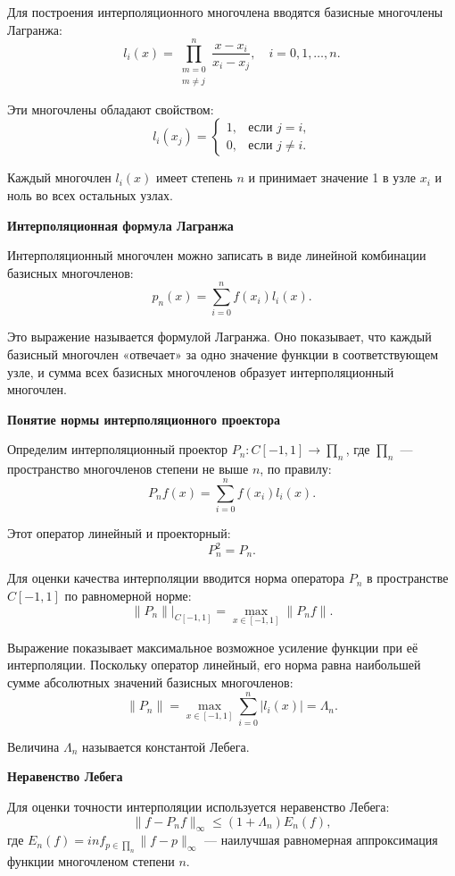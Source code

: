 \documentclass[14pt,openany,a4paper,oneside]{extarticle}
\begin{document}
	Для построения интерполяционного многочлена вводятся базисные многочлены Лагранжа: $$l_i(x)=\prod^n_{\substack{m=0 \\ m \ne j}}\frac{x-x_i}{x_i-x_j},  \quad i=0,1,\dots,n.$$
	
	Эти многочлены обладают свойством: $$l_i(x_j) = \begin{cases}
		1, & \text{если $j = i$,}\\
		0, & \text{если $j \ne i$.}
	\end{cases} 
	$$
	
	Каждый многочлен $l_i(x)$ имеет степень $n$ и принимает значение 1 в узле $x_i$ и ноль во всех остальных узлах.
	
	\textbf{Интерполяционная формула Лагранжа}
	
	Интерполяционный многочлен можно записать в виде линейной комбинации базисных многочленов: $$p_n(x)=\sum^n_{i=0}f(x_i)l_i(x).$$
	
	Это выражение называется формулой Лагранжа. Оно показывает, что каждый базисный многочлен «отвечает» за одно значение функции в соответствующем узле, и сумма всех базисных многочленов образует интерполяционный многочлен.
	
	\newpage 
	
	\textbf{Понятие нормы интерполяционного проектора}
	
	Определим интерполяционный проектор $P_n:C[-1,1]\rightarrow\prod_n$, где $\prod_n$ — пространство многочленов степени не выше $n$, по правилу: $$P_nf(x)=\sum^n_{i=0}f(x_i)l_i(x).$$
	
	Этот оператор линейный и проекторный: $$P_n^2=P_n.$$
	
	Для оценки качества интерполяции вводится норма оператора $P_n$ в пространстве $C[-1,1]$ по равномерной норме: $$\|P_n\||_{C[-1,1]}=\max_{x\in[-1,1]}\|P_nf\|.$$
	
	Выражение показывает максимальное возможное усиление функции при её интерполяции. Поскольку оператор линейный, его норма равна наибольшей сумме абсолютных значений базисных многочленов: $$\|P_n\|=\max_{x\in[-1,1]}\sum_{i=0}^n|l_i(x)|=\Lambda_n.$$
	
	Величина $\Lambda_n$ называется константой Лебега.
	
	\textbf{Неравенство Лебега}
	
	Для оценки точности интерполяции используется неравенство Лебега:
	$$\|f-P_nf\|_\infty \leq (1+\Lambda_n)E_n(f),$$
	где $E_n(f)={inf}_{p\in\prod_n}\|f-p\|_\infty$ — наилучшая равномерная аппроксимация функции многочленом степени $n$.
	
\end{document}
